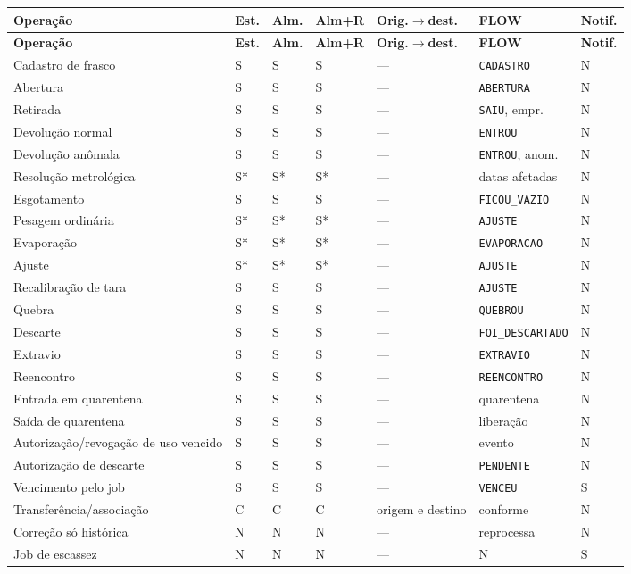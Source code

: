 \setlength{\tabcolsep}{2pt}
\footnotesize
\begin{longtable}{>{\raggedright\arraybackslash}p{} >{\raggedright\arraybackslash}p{} >{\raggedright\arraybackslash}p{} >{\raggedright\arraybackslash}p{} >{\raggedright\arraybackslash}p{} >{\raggedright\arraybackslash}p{} >{\raggedright\arraybackslash}p{}}
\toprule
\textbf{Operação} & \textbf{Est.} & \textbf{Alm.} & \textbf{Alm+R} & \textbf{Orig.$\to$dest.} & \textbf{FLOW} & \textbf{Notif.} \\
\midrule
\endfirsthead
\toprule
\textbf{Operação} & \textbf{Est.} & \textbf{Alm.} & \textbf{Alm+R} & \textbf{Orig.$\to$dest.} & \textbf{FLOW} & \textbf{Notif.} \\
\midrule
\endhead
\bottomrule
\endfoot
Cadastro de frasco & S & S & S & --- & \texttt{CADASTRO} & N \\
Abertura & S & S & S & --- & \texttt{ABERTURA} & N \\
Retirada & S & S & S & --- & \texttt{SAIU}, empr. & N \\
Devolução normal & S & S & S & --- & \texttt{ENTROU} & N \\
Devolução anômala & S & S & S & --- & \texttt{ENTROU}, anom. & N \\
Resolução metrológica & S* & S* & S* & --- & datas afetadas & N \\
Esgotamento & S & S & S & --- & \texttt{FICOU\_VAZIO} & N \\
Pesagem ordinária & S* & S* & S* & --- & \texttt{AJUSTE} & N \\
Evaporação & S* & S* & S* & --- & \texttt{EVAPORACAO} & N \\
Ajuste & S* & S* & S* & --- & \texttt{AJUSTE} & N \\
Recalibração de tara & S & S & S & --- & \texttt{AJUSTE} & N \\
Quebra & S & S & S & --- & \texttt{QUEBROU} & N \\
Descarte & S & S & S & --- & \texttt{FOI\_DESCARTADO} & N \\
Extravio & S & S & S & --- & \texttt{EXTRAVIO} & N \\
Reencontro & S & S & S & --- & \texttt{REENCONTRO} & N \\
Entrada em quarentena & S & S & S & --- & quarentena & N \\
Saída de quarentena & S & S & S & --- & liberação & N \\
Autorização/revogação de uso vencido & S & S & S & --- & evento & N \\
Autorização de descarte & S & S & S & --- & \texttt{PENDENTE} & N \\
Vencimento pelo job & S & S & S & --- & \texttt{VENCEU} & S \\
Transferência/associação & C & C & C & origem e destino & conforme & N \\
Correção só histórica & N & N & N & --- & reprocessa & N \\
Job de escassez & N & N & N & --- & N & S \\
\bottomrule
\end{longtable}
\normalsize

